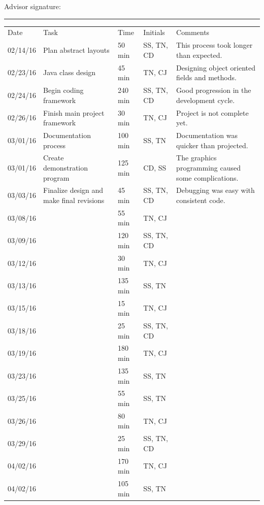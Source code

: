 \documentclass[letterpaper, 10pt]{article}
\begin{document}
	Advisor signature:
	\rule{10cm}{0.4pt}
	\footnotesize
	\begin{center}
	\renewcommand{\arraystretch}{2.15}
	\begin{tabular} { l || p{1.25 in}| l| l|p{2.50in}}
		Date 	& Task 								& Time 	& Initials 		& Comments \\
		02/14/16 	& Plan abstract layouts 					& 50 min 	& SS, TN, CD	& This process took longer than expected. \\
		02/23/16 	& Java class design 						& 45 min 	& TN, CJ 		& Designing object oriented fields and methods.\\
		02/24/16 	& Begin coding framework 				& 240 min & SS, TN, CD	& Good progression in the development cycle.\\
		02/26/16 	& Finish main project framework 			& 30 min	& TN, CJ		& Project is not complete yet.\\
		03/01/16 	& Documentation process 				& 100 min	& SS, TN 		& Documentation was quicker than projected.\\
		03/01/16 	& Create demonstration program 			& 125 min	& CD, SS 		& The graphics programming caused some complications.\\
		03/03/16 	& Finalize design and make final revisions 	& 45 min 	& SS, TN, CD 	& Debugging was easy with consistent code.\\
		03/08/16 	& 									& 55 min 	& TN, CJ 		& \\
		03/09/16 	& 					 				& 120 min & SS, TN, CD	& \\
		03/12/16 	&  									& 30 min	& TN, CJ		& \\
		03/13/16 	&  									& 135 min	& SS, TN 		& \\
		03/15/16 	&  									& 15 min 	& TN, CJ 		& \\
		03/18/16 	&  									& 25 min 	& SS, TN, CD	& \\
		03/19/16 	&  									& 180 min	& TN, CJ		& \\
		03/23/16 	&  									& 135 min	& SS, TN 		& \\
		03/25/16 	&  									& 55 min	& SS, TN 		& \\
		03/26/16 	&  									& 80 min 	& TN, CJ 		& \\
		03/29/16 	&  									& 25 min 	& SS, TN, CD	& \\
		04/02/16 	&  									& 170 min	& TN, CJ		& \\
		04/02/16 	& 					 				& 105 min	& SS, TN 		& \\
		
	\end{tabular}
	\end{center}
	
\end{document}

